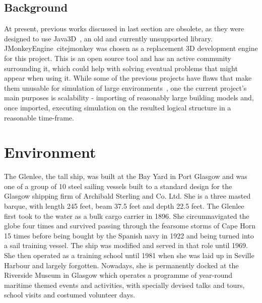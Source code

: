 \documentclass[a4paper,10pt]{article}
\begin{document}
\subsection{Background}
At present, previous works discussed in last section are obsolete, as they were designed to use Java3D~\cite{java3D},
an old and currently unsupported library. JMonkeyEngine~cite{jmonkey} was chosen as a
replacement 3D development engine for this project. This is an open source
tool and has an active community surrounding it, which could help with solving
eventual problems that might appear when using it.
While some of the previous projects have flaws that make them unusable for
simulation of large environments~\cite{glasgowUSimulator}, one the current project’s main purposes is
scalability - importing of reasonably large building models and, once imported,
executing simulation on the resulted logical structure in a reasonable time-frame.

\section{Environment}
The Glenlee, the tall ship, was built at the Bay Yard in Port Glasgow and was one of a group of 10 steel sailing vessels 
built to a standard design for the Glasgow shipping firm of Archibald Sterling and Co. Ltd. 
She is a three masted barque, with length 245 feet, beam 37.5 feet and depth 22.5 feet.
The Glenlee first took to the water as a bulk cargo carrier in 1896. She circumnavigated the globe four times
and survived passing through the fearsome storms of Cape Horn 15 times before 
being bought by the Spanish navy in 1922 and being turned into a sail training vessel. 
The ship was modified and served in that role until 1969. She then operated as a training school until 1981 
when she was laid up in Seville Harbour and largely forgotten.
Nowadays, she is permanently docked at the Riverside Museum in Glasgow which operates a programme of year-round maritime 
themed events and activities, with specially devised talks and tours, school visits and costumed volunteer days.
\end{document}
